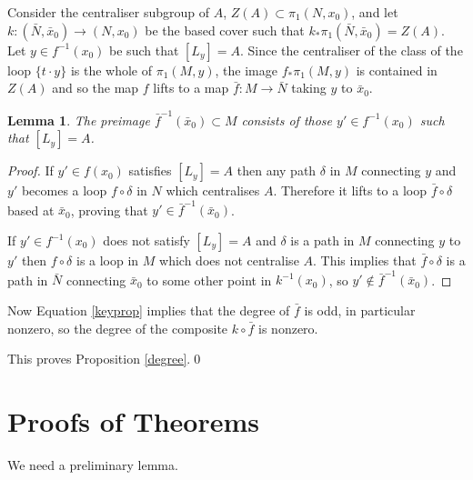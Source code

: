 \documentclass{amsart}
\newtheorem{lma}[thm]{Lemma}
\begin{document}
Consider the centraliser subgroup of $A$, $Z(A)\subset\pi_1(N,x_0)$, and let $k\colon(\bar{N},\bar{x}_0)\to(N,x_0)$ be the based cover such that $k_*\pi_1(\bar{N},\bar{x}_0)=Z(A)$. Let $y\in f^{-1}(x_0)$ be such that $[L_y]=A$. Since the centraliser of the class of the loop $\{t\cdot y\}$ is the whole of $\pi_1(M,y)$, the image $f_*\pi_1(M,y)$ is contained in $Z(A)$ and so the map $f$ lifts to a map $\bar{f}\colon M\to\bar{N}$ taking $y$ to $\bar{x}_0$.
\begin{lma}
The preimage $\bar{f}^{-1}(\bar{x}_0)\subset M$ consists of those $y'\in f^{-1}(x_0)$ such that $[L_y]=A$.
\end{lma}
\begin{proof}
If $y'\in f(x_0)$ satisfies $[L_y]=A$ then any path $\delta$ in $M$ connecting $y$ and $y'$ becomes a loop $f\circ\delta$ in $N$ which centralises $A$. Therefore it lifts to a loop $\bar{f}\circ\delta$ based at $\bar{x}_0$, proving that $y'\in\bar{f}^{-1}(\bar{x}_0)$.

If $y'\in f^{-1}(x_0)$ does not satisfy $[L_y]=A$ and $\delta$ is a path in $M$ connecting $y$ to $y'$ then $f\circ\delta$ is a loop in $M$ which does not centralise $A$. This implies that $\bar{f}\circ\delta$ is a path in $\bar{N}$ connecting $\bar{x}_0$ to some other point in $k^{-1}(x_0)$, so $y'\not\in\bar{f}^{-1}(\bar{x}_0)$.
\end{proof}

Now Equation \ref{keyprop} implies that the degree of $\bar{f}$ is odd, in particular nonzero, so the degree of the composite $k\circ\bar{f}$ is nonzero.

This proves Proposition \ref{degree}.\qed

\section{Proofs of Theorems}

We need a preliminary lemma.
\end{document}
